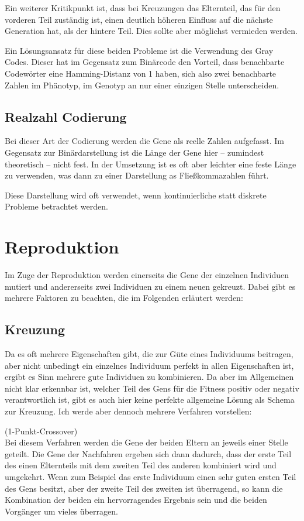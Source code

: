 Ein weiterer Kritikpunkt ist, dass bei Kreuzungen das Elternteil, das für den vorderen Teil zuständig ist, einen deutlich höheren Einfluss auf die nächste Generation hat, als der hintere Teil. Dies sollte aber möglichst vermieden werden.

Ein Lösungsansatz für diese beiden Probleme ist die Verwendung des Gray Codes. Dieser hat im Gegensatz zum Binärcode den Vorteil, dass benachbarte Codewörter eine Hamming-Distanz von 1 haben, sich also zwei benachbarte Zahlen im Phänotyp, im Genotyp an nur einer einzigen Stelle unterscheiden.

\subsection{Realzahl Codierung}
Bei dieser Art der Codierung werden die Gene als reelle Zahlen aufgefasst. Im Gegensatz zur Binärdarstellung ist die Länge der Gene hier -- zumindest theoretisch -- nicht fest. In der Umsetzung ist es oft aber leichter eine feste Länge zu verwenden, was dann zu einer Darstellung as Fließkommazahlen führt.

Diese Darstellung wird oft verwendet, wenn kontinuierliche statt diskrete Probleme betrachtet werden.


\section{Reproduktion}
Im Zuge der Reproduktion werden einerseits die Gene der einzelnen Individuen mutiert und andererseits zwei Individuen zu einem neuen gekreuzt. Dabei gibt es mehrere Faktoren zu beachten, die im Folgenden erläutert werden:
\subsection{Kreuzung}
Da es oft mehrere Eigenschaften gibt, die zur Güte eines Individuums beitragen, aber nicht unbedingt ein einzelnes Individuum perfekt in allen Eigenschaften ist, ergibt es Sinn mehrere gute Individuen zu kombinieren. Da aber im Allgemeinen nicht klar erkennbar ist, welcher Teil des Gens für die Fitness positiv oder negativ verantwortlich ist, gibt es auch hier keine perfekte allgemeine Lösung als Schema zur Kreuzung. Ich werde aber dennoch mehrere Verfahren vorstellen:
\setcounter{algo}{0}
\begin{algo}(1-Punkt-Crossover)\\
	Bei diesem Verfahren werden die Gene der beiden Eltern an jeweils einer Stelle geteilt. Die Gene der Nachfahren ergeben sich dann dadurch, dass der erste Teil des einen Elternteils mit dem zweiten Teil des anderen kombiniert wird und umgekehrt. Wenn zum Beispiel das erste Individuum einen sehr guten ersten Teil des Gens besitzt, aber der zweite Teil des zweiten ist überragend, so kann die Kombination der beiden ein hervorragendes Ergebnis sein und die beiden Vorgänger um vieles überragen.
\end{algo}

